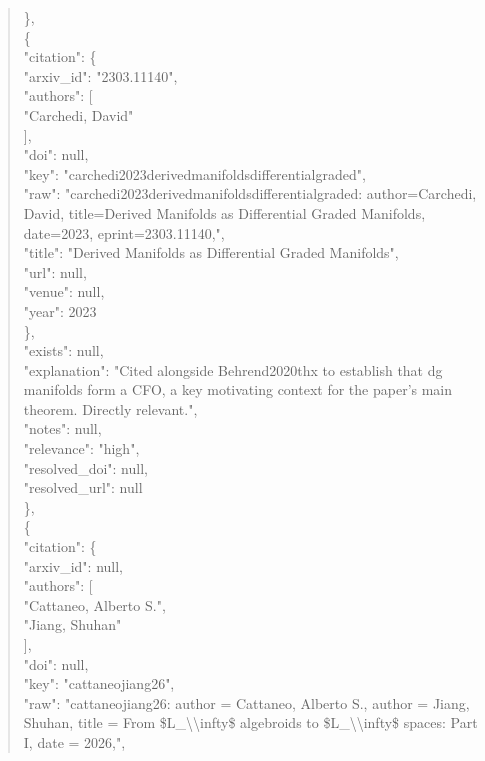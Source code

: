 \documentclass[11pt]{article}
\begin{document}
\begin{quote}
    \},\\
    \{\\
      "citation": \{\\
        "arxiv\_id": "2303.11140",\\
        "authors": [\\
          "Carchedi, David"\\
        ],\\
        "doi": null,\\
        "key": "carchedi2023derivedmanifoldsdifferentialgraded",\\
        "raw": "carchedi2023derivedmanifoldsdifferentialgraded: author=Carchedi, David, title=Derived Manifolds as Differential Graded Manifolds, date=2023, eprint=2303.11140,",\\
        "title": "Derived Manifolds as Differential Graded Manifolds",\\
        "url": null,\\
        "venue": null,\\
        "year": 2023\\
      \},\\
      "exists": null,\\
      "explanation": "Cited alongside Behrend2020thx to establish that dg manifolds form a CFO, a key motivating context for the paper's main theorem. Directly relevant.",\\
      "notes": null,\\
      "relevance": "high",\\
      "resolved\_doi": null,\\
      "resolved\_url": null\\
    \},\\
    \{\\
      "citation": \{\\
        "arxiv\_id": null,\\
        "authors": [\\
          "Cattaneo, Alberto S.",\\
          "Jiang, Shuhan"\\
        ],\\
        "doi": null,\\
        "key": "cattaneojiang26",\\
        "raw": "cattaneojiang26: author = Cattaneo, Alberto S., author = Jiang, Shuhan, title = From \$L\_\textbackslash{}\textbackslash{}infty\$ algebroids to \$L\_\textbackslash{}\textbackslash{}infty\$ spaces: Part I, date = 2026,",\\

\end{quote}
\end{document}
